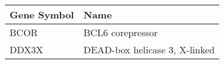 \begin{tabular}{ll}
\toprule
Gene Symbol &                          Name \\
\midrule
       BCOR &              BCL6 corepressor \\
      DDX3X & DEAD-box helicase 3, X-linked \\
\bottomrule
\end{tabular}
